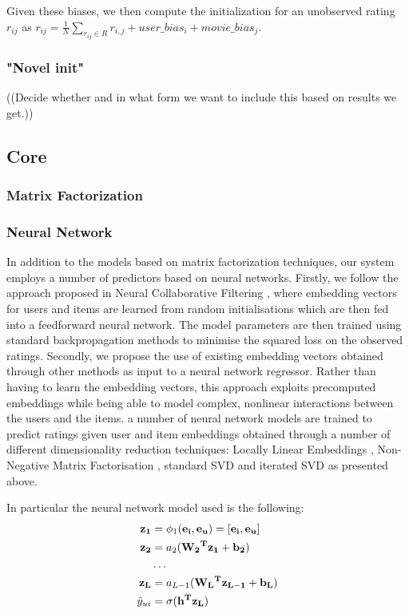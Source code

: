 \documentclass[10pt,conference,compsocconf]{IEEEtran}
\begin{document}
Given these biases, we then compute the initialization for an unobserved rating $r_{ij}$ as $r_{ij} = \frac{1}{N} \sum_{r_{ij} \in R} r_{i,j} + user\_bias_i + movie\_bias_j$.

\subsubsection{"Novel init"}
((Decide whether and in what form we want to include this based on results we get.))

\subsection{Core}
\subsubsection{Matrix Factorization}
\subsubsection{Neural Network}
In addition to the models based on matrix factorization techniques, our system employs a number of predictors based on neural networks. Firstly, we follow the approach proposed in Neural Collaborative Filtering \cite{he2017neural}, where embedding vectors for users and items are learned from random initialisations which are then fed into a feedforward neural network. The model parameters are then trained using standard backpropagation methods to minimise the squared loss on the observed ratings. 
Secondly, we propose the use of existing embedding vectors obtained through other methods as input to a neural network regressor. Rather than having to learn the embedding vectors, this approach exploits precomputed embeddings while being able to model complex, nonlinear interactions  between the users and the items. 
a number of neural network models are trained to predict ratings given user and item embeddings obtained through a number of different dimensionality reduction techniques: Locally Linear Embeddings \cite{roweis2000nonlinear}, Non-Negative Matrix Factorisation \cite{cichocki2009fast}, standard SVD and iterated SVD as presented above.

In particular the neural network model used is the following:
\begin{equation}
\begin{aligned}
    \bf{z_1} &= \phi_1(\bf{e_i}, \bf{e_u}) = [\bf{e_i}, \bf{e_u}]\\
    \bf{z_2} &= a_2(\bf{W_2}^T \bf{z_1} + b_2) \\
    &\dots \\
    \bf{z_L} &= a_{L - 1 }(\bf{W_{L}}^T \bf{z_{L - 1}} + b_L) \\
    \hat y_{ui} &= \sigma(\bf{h}^T \bf{z_L})
\end{aligned}
\end{equation}
\end{document}
